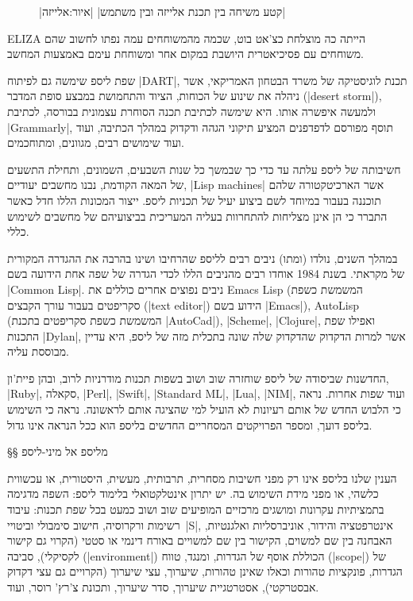 \begin{figure}[H]
\centering
\begin{LTR} \scriptsize
  
\end{LTR}
|קטע משיחה בין תכנת אלייזה ובין משתמש|
|איור:אלייזה|
\end{figure}

ELIZA הייתה כה מוצלחת כצ'אט בוט, שכמה מהמשוחחים עמה נפתו לחשוב שהם משוחחים עם
פסיכיאטרית היושבת במקום אחר ומשוחחת עימם באמצעות המחשב.

שפת ליספ שימשה גם לפיתוח \E|DART|, תכנת לוגיסטיקה של משרד הבטחון האמריקאי, אשר
ניהלה את שינוע של הכוחות, הציוד והתחמושת במבצע סופת המדבר (\E|desert storm|),
ולמעשה איפשרה אותו. היא שימשה לכתיבת תכנה הסוחרת עצמונית בבורסה, לכתיבת
\E|Grammarly|, תוסף מפורסם לדפדפנים המציע תיקוני הגהה ודקדוק במהלך הכתיבה, ועוד
ועוד שימושים רבים, מגוונים, ומתוחכמים.

חשיבותה של ליספ עלתה עד כדי כך שבמשך כל שנות השבעים, השמונים, ותחילת התשעים של
המאה הקודמת, נבנו מחשבים יעודיים, \E|Lisp machines| אשר הארכיטקטורה שלהם תוכננה
בעבור במיוחד לשם ביצוע יעיל של תכניות ליספ. ייצור המכונות הללו חדל כאשר התברר
כי הן אינן מצליחות להתחרוות בעליה המעריכית בביצועיהם של מחשבים לשימוש כללי.

במהלך השנים, נולדו (ומתו) ניבים רבים לליספ שהרחיבו ושינו בהרבה את ההגדרה
המקורית של מקראתי. בשנת 1984 אוחדו רבים מהניבים הללו לכדי הגדרה של שפה אחת
הידועה בשם \E|Common Lisp|. ניבים נפוצים אחרים כוללים את Emacs Lisp (המשמשת
כשפת סקריפטים בעבור עורך הקבצים (\E|text editor|) הידוע בשם \E|Emacs|),
AutoLisp (המשמשת כשפת סקריפטים בתכנת \E|AutoCad|), \E|Scheme|, \E|Clojure|,
ואפילו שפת התכנות \E|Dylan|, אשר למרות הדקדוק שהדקדוק שלה שונה בתכלית מזה של
ליספ, היא עדיין מבוססת עליה.

החדשנות שביסודה של ליספ שוחזרה שוב ושוב בשפות תכנות מודרניות לרוב, ובהן
פיית'ון, \E|Ruby|, סקאלה, \E|Perl|, \E|Swift|, \E|Standard ML|, \E|Lua|,
\E|NIM|, ועוד שפות אחרות. נראה כי הלבוש החדש של אותם רעיונות לא הועיל למי
שהציגה אותם לראשונה. נראה כי השימוש בליספ דועך, ומספר הפרויקטים המסחריים החדשים
בליספ הוא ככל הנראה אינו גדול.

§§ מליספ אל מיני-ליספ

הענין שלנו בליספ אינו רק מפני חשיבות מסחרית, תרבותית, מעשית, היסטורית, או
עכשווית כלשהי, או מפני מידת השימוש בה. יש יתרון אינטלקטואלי בלימוד ליספ: השפה
מדגימה בתמציתיות עקרונות ומושגים מרכזיים המופיעים שוב ושוב כמעט בכל שפת תכנות:
עיבוד רשימות ורקרוסיה, חישוב סימבולי וביטויי~\E|S|, אינטרפטציה והידור,
אוניברסליות ואלגנטיות, האבחנה בין שם למשוים, הקישור בין שם למשויים באורח דינמי
או סטטי (הקרוי גם קישור לקסיקלי), סביבה (\E|environment|) הכוללת אוסף של
הגדרות, ומנגד, טווח (\E|scope|) של הגדרות, פונקציות טהורות וכאלו שאינן טהורות,
שיערוך, עצי שיערוך (הקרויים גם עצי דקדוק אבסטרקטי), אסטרטגיית שיערוך, סדר
שיערוך, ותכונת צ'רץ' רוסר, ועוד.

